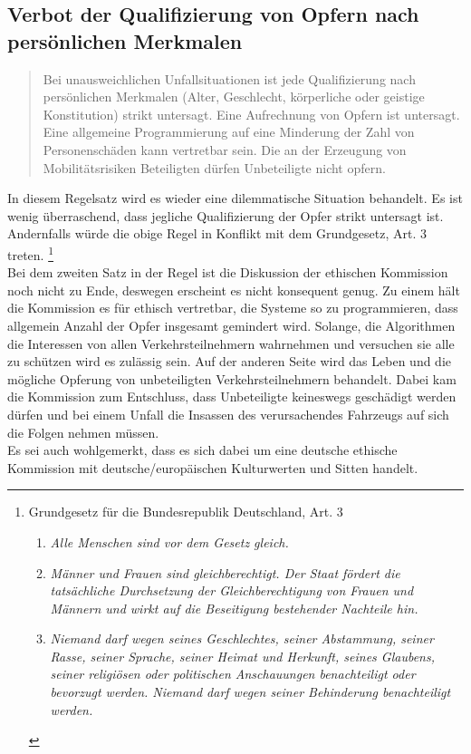 \documentclass[twoside,a4paper,12pt]{article}
\begin{document}
\subsection{Verbot der Qualifizierung von Opfern nach persönlichen Merkmalen} \label{VerbotDerQualifizierungMoeglicherOpferNachPersönlichenMerkmalen}

\begin{quote}
\glqq
Bei unausweichlichen Unfallsituationen ist jede Qualifizierung nach persönlichen Merkmalen (Alter, Geschlecht, 
körperliche oder geistige Konstitution) strikt untersagt. Eine
Aufrechnung von Opfern ist untersagt. Eine allgemeine Programmierung auf eine Minderung der Zahl von Personenschäden 
kann vertretbar sein. Die an der Erzeugung von
Mobilitätsrisiken Beteiligten dürfen Unbeteiligte nicht opfern.\grqq\mbox{~\cite[S. 11]{ek}}
\end{quote}
In diesem Regelsatz wird es wieder eine dilemmatische Situation behandelt. Es ist wenig überraschend, dass jegliche Qualifizierung der Opfer strikt untersagt ist. Andernfalls würde die obige Regel in Konflikt mit dem Grundgesetz, Art. 3 treten.
\footnote{Grundgesetz für die Bundesrepublik Deutschland, Art. 3
\begin{enumerate} 
\item \textit{Alle Menschen sind vor dem Gesetz gleich.}
\item \textit{Männer und Frauen sind gleichberechtigt. Der Staat fördert die tatsächliche Durchsetzung der Gleichberechtigung von Frauen und Männern und wirkt auf die Beseitigung bestehender Nachteile hin.}
\item\textit{ Niemand darf wegen seines Geschlechtes, seiner Abstammung, seiner Rasse, seiner Sprache, seiner Heimat und Herkunft, seines Glaubens, seiner religiösen oder politischen Anschauungen benachteiligt oder bevorzugt werden. Niemand darf wegen seiner Behinderung benachteiligt werden.}
\end{enumerate}}
\\
Bei dem zweiten Satz in der Regel ist die Diskussion der ethischen Kommission noch nicht zu Ende, deswegen erscheint es nicht konsequent genug. Zu einem hält die Kommission es für ethisch vertretbar, die Systeme so zu programmieren, dass allgemein Anzahl der Opfer insgesamt gemindert wird. Solange, die Algorithmen die Interessen von allen Verkehrsteilnehmern wahrnehmen und versuchen sie alle zu schützen wird es zulässig sein. Auf der anderen Seite wird das Leben und die mögliche Opferung von unbeteiligten Verkehrsteilnehmern behandelt. Dabei kam die Kommission zum Entschluss, dass Unbeteiligte keineswegs geschädigt werden dürfen und bei einem Unfall die Insassen des verursachendes Fahrzeugs auf sich die Folgen nehmen müssen.
\\
Es sei auch wohlgemerkt, dass es sich dabei um eine deutsche ethische Kommission mit deutsche/europäischen Kulturwerten und Sitten handelt. 
\end{document}
